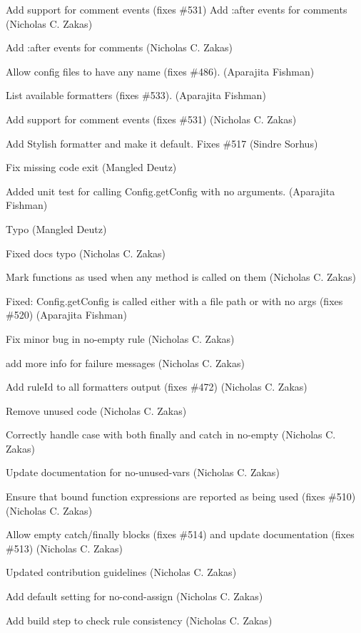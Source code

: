 \begin{DoxyItemize}
\item Add support for comment events (fixes \#531) Add \+:after events for comments (Nicholas C. Zakas)
\item Add \+:after events for comments (Nicholas C. Zakas)
\item Allow config files to have any name (fixes \#486). (Aparajita Fishman)
\item List available formatters (fixes \#533). (Aparajita Fishman)
\item Add support for comment events (fixes \#531) (Nicholas C. Zakas)
\item Add Stylish formatter and make it default. Fixes \#517 (Sindre Sorhus)
\item Fix missing code exit (Mangled Deutz)
\item Added unit test for calling Config.\+get\+Config with no arguments. (Aparajita Fishman)
\item Typo (Mangled Deutz)
\item Fixed docs typo (Nicholas C. Zakas)
\item Mark functions as used when any method is called on them (Nicholas C. Zakas)
\item Fixed\+: Config.\+get\+Config is called either with a file path or with no args (fixes \#520) (Aparajita Fishman)
\item Fix minor bug in no-\/empty rule (Nicholas C. Zakas)
\item add more info for failure messages (Nicholas C. Zakas)
\item Add rule\+Id to all formatters output (fixes \#472) (Nicholas C. Zakas)
\item Remove unused code (Nicholas C. Zakas)
\item Correctly handle case with both finally and catch in no-\/empty (Nicholas C. Zakas)
\item Update documentation for no-\/unused-\/vars (Nicholas C. Zakas)
\item Ensure that bound function expressions are reported as being used (fixes \#510) (Nicholas C. Zakas)
\item Allow empty catch/finally blocks (fixes \#514) and update documentation (fixes \#513) (Nicholas C. Zakas)
\item Updated contribution guidelines (Nicholas C. Zakas)
\item Add default setting for no-\/cond-\/assign (Nicholas C. Zakas)
\item Add build step to check rule consistency (Nicholas C. Zakas)

\end{DoxyItemize}
